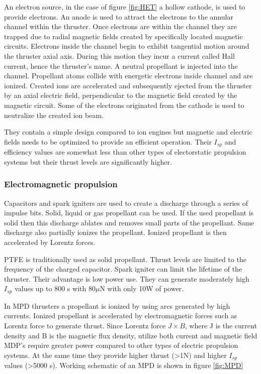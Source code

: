 An electron source, in the case of figure \ref{fig:HET} a hollow cathode, is used to provide electrons. An anode is used to attract the electrons to the annular channel within the thruster. Once electrons are within the channel they are trapped due to radial magnetic fields created by specifically located magnetic circuits. Electrons inside the channel begin to exhibit tangential motion around the thruster axial axis. During this motion they incur a current called Hall current, hence the thruster's name. A neutral propellant is injected into the channel. Propellant atoms collide with energetic electrons inside channel and are ionized. Created ions are accelerated and subsequently ejected from the thruster by an axial electric field, perpendicular to the magnetic field created by the magnetic circuit. Some of the electrons originated from the cathode is used to neutralize the created ion beam. 

\par They contain a simple design compared to ion engines but magnetic and electric fields needs to be optimized to provide an efficient operation. Their $I_{sp}$ and efficiency values are somewhat less than other types of electorstatic propulsion systems but their thrust levels are significantly higher\cite{goebel2008fundamentals}. 



\subsubsection{Electromagnetic propulsion}

Capacitors and spark igniters are used to create a discharge through a series of impulse bits. Solid, liquid or gas propellant can be used. If the used propellant is solid then this discharge ablates and removes small parts of the propellant. Same discharge also partially ionizes the propellant. Ionized propellant is then accelerated by Lorentz forces\cite{lemmer2017propulsion}. 
\par PTFE is traditionally used as solid propellant\cite{yost2021state}. Thrust levels are limited to the frequency of the charged capacitor. Spark igniter can limit the lifetime of the thruster. Their advantage is low power use. They can generate moderately high $I_{sp}$ values up to 800 s with 80$\mu$N with only 10W of power\cite{Calik2011}.

In MPD thrusters a propellant is ionized by using arcs generated by high currents. Ionized propellant is accelerated by electromagnetic forces such as Lorentz force to generate thrust. Since Lorentz force $J\times B$, where J is the current density and B is the magnetic flux density, utilize both current and magnetic field MDP's require greater power compared to other types of electric propulsion systems. At the same time they provide higher thrust (>1N) and higher $I_{sp}$ values (>5000 s)\cite{zheng2021integrated}. Working schematic of an MPD is shown in figure \ref{fig:MPD}

